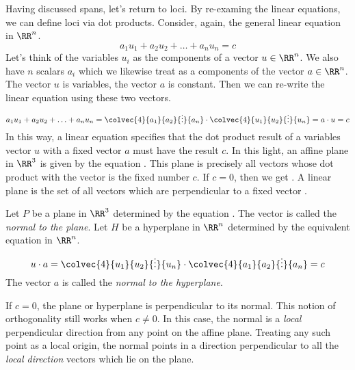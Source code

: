 \documentclass[fleqn]{report}
\begin{document}
Having discussed spans, let's return to loci. By re-examing
the linear equations, we can define loci via dot products. Consider,
again, the general linear equation in $\RR^n$.
\begin{equation*}
a_1 u_1 + a_2 u_2 + \ldots + a_n u_n = c
\end{equation*}
Let's think of the variables $u_i$ as the components of a
vector $u \in \RR^n$. We also have $n$ scalars $a_i$ which we
likewise treat as a components of the vector $a \in \RR^n$.
The vector $u$ is variables, the vector $a$ is constant.
Then we can re-write the linear equation using these two
vectors.
\begin{equation*}
a_1 u_1 + a_2 u_2 + \ldots + a_n u_n =
\colvec{4}{a_1}{a_2}{\vdots}{a_n} \cdot
\colvec{4}{u_1}{u_2}{\vdots}{u_n} = 
a \cdot u = c
\end{equation*}
In this way, a linear equation specifies that the dot product
result of a variables vector $u$ with a fixed vector $a$ must
have the result $c$. In this light, an affine plane in $\RR^3$
is given by the equation . This plane is precisely
all vectors whose dot product with the vector  is the fixed number $c$.
If $c=0$, then we get . A linear plane is the
set of all vectors which are perpendicular to a fixed vector
. 

\begin{defn}
Let $P$ be a plane in $\RR^3$ determined by the equation 
. 
The vector  is
called the \emph{normal to the plane}. 
Let $H$ be a hyperplane in $\RR^n$ determined by the
equivalent equation in $\RR^n$.
\begin{displaymath}
u \cdot a = \colvec{4}{u_1}{u_2}{\vdots}{u_n} \cdot
\colvec{4}{a_1}{a_2}{\vdots}{a_n} = c
\end{displaymath} 
The vector $a$ is called the \emph{normal to the hyperplane}. 
\end{defn} 

If $c=0$, the plane or hyperplane is perpendicular to its
normal. This notion of orthogonality still works when $c
\neq 0$. In this case, the normal is a \emph{local} perpendicular
direction from any point on the affine plane. Treating any such
point as a local origin, the normal points in a direction
perpendicular to all the \emph{local direction} vectors which
lie on the plane. 
\end{document}
